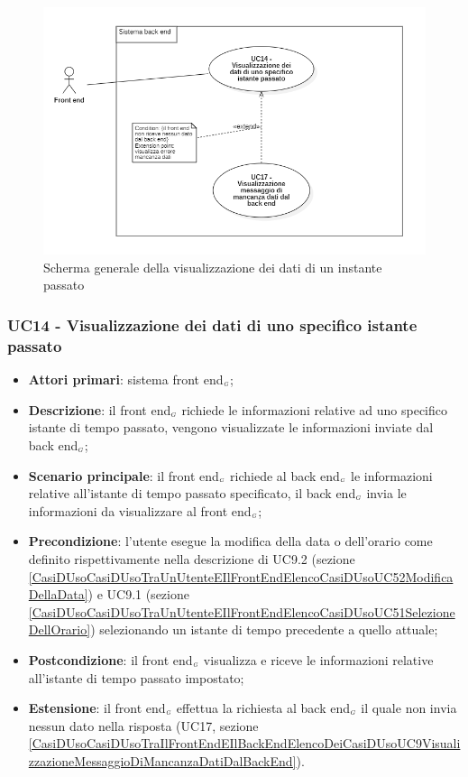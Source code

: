 \begin{center}
	\begin{figure}[H]
		\centering\includegraphics[scale=0.6]{../immagini/attori_casi/UC_14.png}
		\caption{Scherma generale della visualizzazione dei dati di un instante passato}
	\end{figure}
\end{center}

\subsubsection{UC14 - Visualizzazione dei dati di uno specifico istante passato}\label{CasiDUsoCasiDUsoTraIlFrontEndEIlBackEndElencoDeiCasiDUsoUC81VisualizzazioneDeiDatiDiUnoSpecificoIstante}
\begin{itemize}
	\item \textbf{Attori primari}: sistema front end$_{\scaleto{G}{3pt}}$;
	\item \textbf{Descrizione}: il front end$_{\scaleto{G}{3pt}}$ richiede le informazioni relative ad uno specifico istante di tempo passato, vengono visualizzate le informazioni inviate dal back end$_{\scaleto{G}{3pt}}$;
	\item \textbf{Scenario principale}:  il front end$_{\scaleto{G}{3pt}}$ richiede al back end$_{\scaleto{G}{3pt}}$ le informazioni relative all'istante di tempo passato specificato, il back end$_{\scaleto{G}{3pt}}$ invia le informazioni da visualizzare al front end$_{\scaleto{G}{3pt}}$;
	\item \textbf{Precondizione}: l’utente esegue la modifica della data o dell’orario come definito rispettivamente nella descrizione di UC9.2 (sezione \ref{CasiDUsoCasiDUsoTraUnUtenteEIlFrontEndElencoCasiDUsoUC52ModificaDellaData}) e UC9.1 (sezione \ref{CasiDUsoCasiDUsoTraUnUtenteEIlFrontEndElencoCasiDUsoUC51SelezioneDellOrario}) selezionando un istante di tempo precedente a quello attuale;
	\item \textbf{Postcondizione}: il front end$_{\scaleto{G}{3pt}}$ visualizza e riceve le informazioni relative all'istante di tempo passato impostato;
	\item \textbf{Estensione}: il front end$_{\scaleto{G}{3pt}}$ effettua la richiesta al back end$_{\scaleto{G}{3pt}}$ il quale non invia nessun dato nella risposta (UC17, sezione \ref{CasiDUsoCasiDUsoTraIlFrontEndEIlBackEndElencoDeiCasiDUsoUC9VisualizzazioneMessaggioDiMancanzaDatiDalBackEnd}).
\end{itemize}

